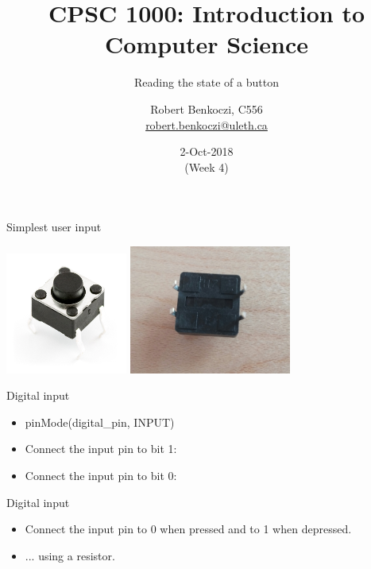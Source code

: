 \documentclass[aspectratio=1610]{beamer}
\title %
{CPSC 1000: Introduction to Computer Science}
\subtitle{Reading the state of a button} %
\author{Robert Benkoczi, C556\\\url{robert.benkoczi@uleth.ca}}
\date{2-Oct-2018\\(Week 4)}
\begin{document}
\begin{frame}[plain]
\titlepage
\end{frame}


\begin{frame}[t,plain]{Simplest user input}

\includegraphics[width=0.3\textwidth]{figs/2-button.jpg}
\hfill
\includegraphics[width=0.4\textwidth]{figs/2-button_back.jpg}
\hfill ~
\end{frame}



\begin{frame}[t,plain]{Digital input}

\begin{itemize}
\item pinMode(digital\_pin, INPUT)

\bigskip
\item Connect the input pin to bit 1:

\vspace*{0.4\textheight}
\item Connect the input pin to bit 0:
\end{itemize}
\end{frame}



\begin{frame}[t,plain]{Digital input}
\begin{itemize}
\item Connect the input pin to 0 when pressed and to 1 when depressed.

\vspace*{.4\textheight}
\item ... using a resistor.
\end{itemize}
\end{frame}
\end{document}
